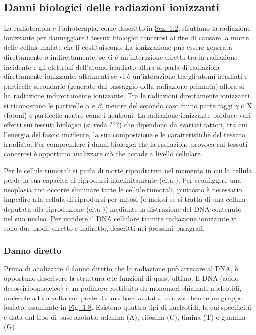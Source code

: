 \documentclass[12pt,a4paper,twoside]{report}
\begin{document}
	\subsection{Danni biologici delle radiazioni ionizzanti}
	La radioterapia e l'adroterapia, come descritto in \hyperref[sec:1.2]{Sez. 1.2}, sfruttano la radiazione ionizzante per danneggiare i tessuti biologici cancerosi al fine di causare la morte delle cellule malate che li costituiscono. La ionizzazione può essere generata direttamente o indirettamente: se vi è un'interazione diretta tra la radiazione incidente e gli elettroni dell'atomo irradiato allora si parla di radiazione direttamente ionizzante, altrimenti se vi è un'interazione tra gli atomi irradiati e particelle secondarie (generate dal passaggio della radiazione primaria) allora si ha radiazione indirettamente ionizzante. Tra le radiazioni direttamente ionizzanti si riconoscono le particelle $\alpha$ e $\beta$, mentre del secondo caso fanno parte raggi $\gamma$ o X (fotoni) e particelle neutre come i neutroni. La radiazione ionizzante produce vari effetti sui tessuti biologici (si veda \hyperref[qualcosa]{???}) che dipendono da svariati fattori, tra cui l'energia del fascio incidente, la sua composizione e le caratteristiche del tessuto irradiato. Per comprendere i danni biologici che la radiazione provoca sui tessuti cancerosi è opportuno analizzare ciò che accade a livello cellulare.
	
	Per le cellule tumorali si parla di morte riproduttiva nel momento in cui la cellula perde la sua capacità di riprodursi indefinitamente (cita
	). Per sconfiggere una neoplasia non occorre eliminare tutte le cellule tumorali, piuttosto è necessario impedire alla cellula di riprodursi per mitosi (o meiosi se si tratta di una cellula deputata alla riproduzione (cita
	)) mediante la distruzione del DNA contenuto nel suo nucleo. Per uccidere il DNA cellulare tramite radiazione ionizzante vi sono due modi, diretto e indiretto, descritti nei prossimi paragrafi.
	
	\subsubsection{Danno diretto}\label{par:danno_diretto}
	Prima di analizzare il danno diretto che la radiazione può arrecare al DNA, è opportuno descrivere la struttura e le funzioni di quest'ultimo. Il DNA (acido desossiribonucleico) è un polimero costituito da monomeri chiamati nucleotidi, molecole a loro volta composte da una base azotata, uno zucchero e un gruppo fosfato, esaminate in \hyperref[fig:nucleotide]{Fig. 1.8}. Esistono quattro tipi di nucleotidi, la cui specificità è data dal tipo di base azotata: adenina (A), citosina (C), timina (T) o guanina (G).
	
\end{document}
